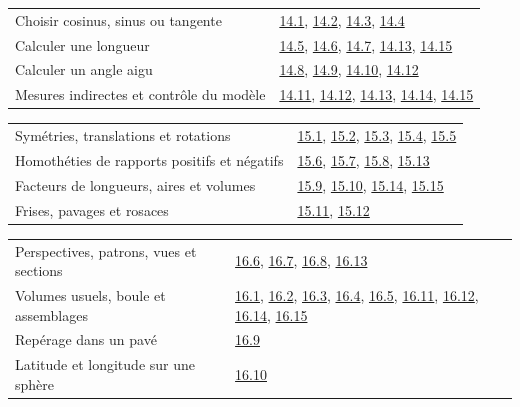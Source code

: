 \begin{tabularx}{\linewidth}{@{}Yl@{}}\toprule
Choisir cosinus, sinus ou tangente & \hyperref[exo-14-1]{14.1}, \hyperref[exo-14-2]{14.2}, \hyperref[exo-14-3]{14.3}, \hyperref[exo-14-4]{14.4}\\[2mm]
Calculer une longueur & \hyperref[exo-14-5]{14.5}, \hyperref[exo-14-6]{14.6}, \hyperref[exo-14-7]{14.7}, \hyperref[exo-14-13]{14.13}, \hyperref[exo-14-15]{14.15}\\[2mm]
Calculer un angle aigu & \hyperref[exo-14-8]{14.8}, \hyperref[exo-14-9]{14.9}, \hyperref[exo-14-10]{14.10}, \hyperref[exo-14-12]{14.12}\\[2mm]
Mesures indirectes et contrôle du modèle & \hyperref[exo-14-11]{14.11}, \hyperref[exo-14-12]{14.12}, \hyperref[exo-14-13]{14.13}, \hyperref[exo-14-14]{14.14}, \hyperref[exo-14-15]{14.15}\\[2mm]
\bottomrule\end{tabularx}\par\vspace{4mm}
\begin{tabularx}{\linewidth}{@{}Yl@{}}\toprule
Symétries, translations et rotations & \hyperref[exo-15-1]{15.1}, \hyperref[exo-15-2]{15.2}, \hyperref[exo-15-3]{15.3}, \hyperref[exo-15-4]{15.4}, \hyperref[exo-15-5]{15.5}\\[2mm]
Homothéties de rapports positifs et négatifs & \hyperref[exo-15-6]{15.6}, \hyperref[exo-15-7]{15.7}, \hyperref[exo-15-8]{15.8}, \hyperref[exo-15-13]{15.13}\\[2mm]
Facteurs de longueurs, aires et volumes & \hyperref[exo-15-9]{15.9}, \hyperref[exo-15-10]{15.10}, \hyperref[exo-15-14]{15.14}, \hyperref[exo-15-15]{15.15}\\[2mm]
Frises, pavages et rosaces & \hyperref[exo-15-11]{15.11}, \hyperref[exo-15-12]{15.12}\\[2mm]
\bottomrule\end{tabularx}\par\vspace{4mm}
\clearpage
{}\fontsize{10}{13}\selectfont
{}\begin{tabularx}{\linewidth}{@{}Yl@{}}\toprule
Perspectives, patrons, vues et sections & \hyperref[exo-16-6]{16.6}, \hyperref[exo-16-7]{16.7}, \hyperref[exo-16-8]{16.8}, \hyperref[exo-16-13]{16.13}\\[2mm]
Volumes usuels, boule et assemblages & \hyperref[exo-16-1]{16.1}, \hyperref[exo-16-2]{16.2}, \hyperref[exo-16-3]{16.3}, \hyperref[exo-16-4]{16.4}, \hyperref[exo-16-5]{16.5}, \hyperref[exo-16-11]{16.11}, \hyperref[exo-16-12]{16.12}, \hyperref[exo-16-14]{16.14}, \hyperref[exo-16-15]{16.15}\\[2mm]
Repérage dans un pavé & \hyperref[exo-16-9]{16.9}\\[2mm]
Latitude et longitude sur une sphère & \hyperref[exo-16-10]{16.10}\\[2mm]
\bottomrule\end{tabularx}\par\vspace{4mm}
